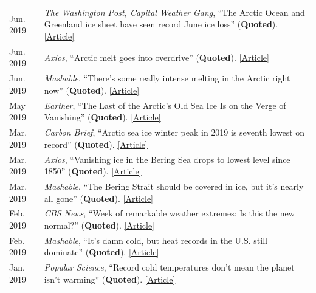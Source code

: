 \documentclass[margin,line,palatino,courier,10pt]{res}
\begin{document}
\begin{resume}
\begin{tabular}{@{}p{0.9in}p{4in}}
Jun. 2019 & \textit{The Washington Post, Capital Weather Gang}, ``The Arctic Ocean and Greenland ice sheet have seen record June ice loss'' (\textbf{Quoted}). \href{https://www.washingtonpost.com/weather/2019/06/14/arctic-ocean-greenland-ice-sheet-have-seen-record-june-ice-loss/?utm_term=.7539db99ca6e}{[Article]}\\
Jun. 2019 & \textit{Axios}, ``Arctic melt goes into overdrive'' (\textbf{Quoted}). \href{https://www.axios.com/newsletters/axios-science-9172185b-a9a1-498f-9014-4ee04e1ff826.html?chunk=3#story3}{[Article]}\\
Jun. 2019 & \textit{Mashable}, ``There's some really intense melting in the Arctic right now'' (\textbf{Quoted}). \href{https://mashable.com/article/arctic-melting-records/}{[Article]}\\
May 2019 & \textit{Earther}, ``The Last of the Arctic's Old Sea Ice Is on the Verge of Vanishing'' (\textbf{Quoted}). \href{https://earther.gizmodo.com/the-last-of-the-arctics-old-sea-ice-is-on-the-verge-of-1834510753}{[Article]}\\
Mar. 2019 & \textit{Carbon Brief}, ``Arctic sea ice winter peak in 2019 is seventh lowest on record'' (\textbf{Quoted}). \href{https://www.carbonbrief.org/arctic-sea-ice-winter-peak-in-2019-is-seventh-lowest-on-record}{[Article]}\\
Mar. 2019 & \textit{Axios}, ``Vanishing ice in the Bering Sea drops to lowest level since 1850'' (\textbf{Quoted}). \href{https://www.axios.com/bering-sea-ice-vanishing-a23bacda-a08d-4ec7-9124-419b90b984a2.html}{[Article]}\\
Mar. 2019 &\textit{Mashable}, ``The Bering Strait should be covered in ice, but it's nearly all gone'' (\textbf{Quoted}). \href{https://mashable.com/article/bering-strait-sea-ice-gone-2019-arctic/#zs3hdvbg3mqc}{[Article]}\\
Feb. 2019 & \textit{CBS News}, ``Week of remarkable weather extremes: Is this the new normal?'' (\textbf{Quoted}). \href{https://www.cbsnews.com/news/remarkable-weather-extremes-is-this-the-new-normal-climate-change/?ftag=CNM-00-10aab7e&linkId=64169123}{[Article]}\\
Feb. 2019 & \textit{Mashable}, ``It's damn cold, but heat records in the U.S. still dominate'' (\textbf{Quoted}). \href{https://mashable.com/article/polar-vortex-climate-change-cold-record/#xQmvXhcFJPqH}{[Article]}\\
Jan. 2019 & \textit{Popular Science}, ``Record cold temperatures don't mean the planet isn't warming'' (\textbf{Quoted}). \href{https://www.popsci.com/cold-weather-climate-change}{[Article]}\\

\end{tabular}
\end{resume}
\end{document}
